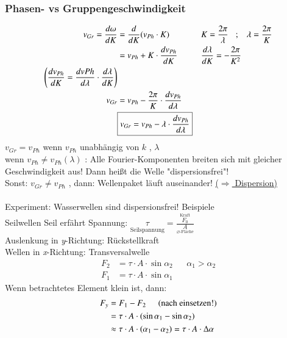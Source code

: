 \subsubsection{Phasen- vs Gruppengeschwindigkeit}
\begin{align*}
v_{Gr} = \frac{d\omega}{dK} &= \frac{d}{dK} (v_{Ph} \cdot K) &&K=\frac{2\pi}{\lambda} \hspace{3mm};\hspace{3mm}\lambda=\frac{2\pi}{K}\\
&=v_{Ph} + K \cdot \frac{dv_{Ph}}{dK} &&\frac{d\lambda}{dK} = - \frac{2\pi}{K^2}\\
\left( \frac{dv_{Ph}}{dK} = \frac{dv{Ph}}{d\lambda} \cdot \frac{d\lambda}{dK}  \right) \\
v_{Gr} &= v_{Ph} -  \frac{2\pi}{K} \cdot \frac{ dv_{Ph} }{d\lambda} \\
&\boxed{v_{Gr} = v_{Ph} - \lambda \cdot \frac{ dv_{Ph} }{d\lambda} }
\end{align*}
$ v_{Gr}  = v _{Ph} $ wenn $ v_{Ph} $ unabhängig von $ k $ , $ \lambda $\\
wenn $ v_{Ph} \neq v_{Ph}(\lambda) $ : Alle Fourier-Komponenten breiten sich mit gleicher Geschwindigkeit aus! Dann heißt die Welle "dispersionsfrei"!\\
Sonst: $ v_{Gr} \neq v_{Ph} $ , dann: Wellenpaket läuft auseinander! \underline{($ \Rightarrow $ Dispersion)}\\
\hfill \\
Experiment: Wasserwellen sind dispersionsfrei!
\bild
Beispiele\\
Seilwellen
\bild
Seil erfährt Spannung: $ \underset{\text{Seilspannung}}{\tau} = \frac{\overset{\text{Kraft}}{F_0}}{\underset{\varnothing \text{-Fläche}}{A}} $\\
Auslenkung in \emph{y}-Richtung: Rückstellkraft\\
Wellen in \emph{x}-Richtung: Transversalwelle\\
\begin{align*}
F_2 &= \tau\cdot A \cdot\sin\alpha_2 &&\alpha_1>\alpha_2\\
F_1 &= \tau\cdot A \cdot\sin\alpha_1
\end{align*}
Wenn betrachtetes Element klein ist, dann:
\begin{align*}
F_y &= F_1 - F_2 \hspace{5mm} \text{(nach einsetzen!)}\\
&= \tau \cdot A \cdot (\sin\alpha_1 - \sin\alpha_2)\\
&\approx\tau \cdot A \cdot ( \alpha_1 - \alpha_2) = \tau \cdot A \cdot \Delta\alpha
\end{align*}
